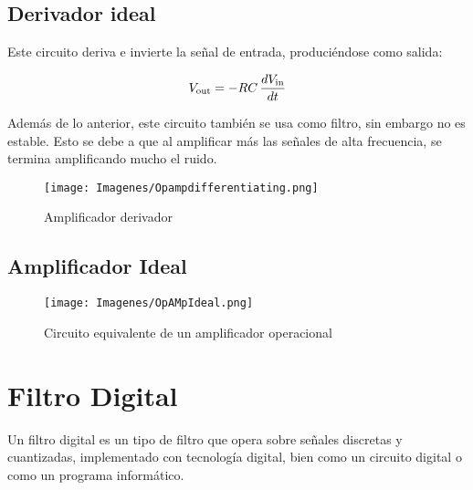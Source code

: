 \documentclass{article}
\begin{document}
   

\subsection{Derivador ideal}

Este circuito deriva e invierte la señal de entrada, produciéndose como salida:\citep{AmplificadorOperacional}

\begin{equation}
    {\displaystyle V_{\rm {out}}=-RC\,{dV_{\rm {in}} \over dt}} 
\end{equation}

Además de lo anterior, este circuito también se usa como filtro, sin embargo no es estable. Esto se debe a que al amplificar más las señales de alta frecuencia, se termina amplificando mucho el ruido.\citep{AmplificadorOperacional}

\begin{figure}[h!]
    \centering
    \texttt{[image: Imagenes/Opampdifferentiating.png]}
    \caption{Amplificador derivador}
    \label{fig:OpAmpDerivador}
\end{figure}

\subsection{Amplificador Ideal}

\begin{figure}
    \centering
    \texttt{[image: Imagenes/OpAMpIdeal.png]}
    \caption{Circuito equivalente de un amplificador operacional\citep{AmplificadorOperacional}}
    \label{fig:opAmpIdeal}
\end{figure}

\section{Filtro Digital}

Un filtro digital es un tipo de filtro que opera sobre señales discretas y cuantizadas, implementado con tecnología digital, bien como un circuito digital o como un programa informático.\citep{FiltroDigital}\\
\end{document}
